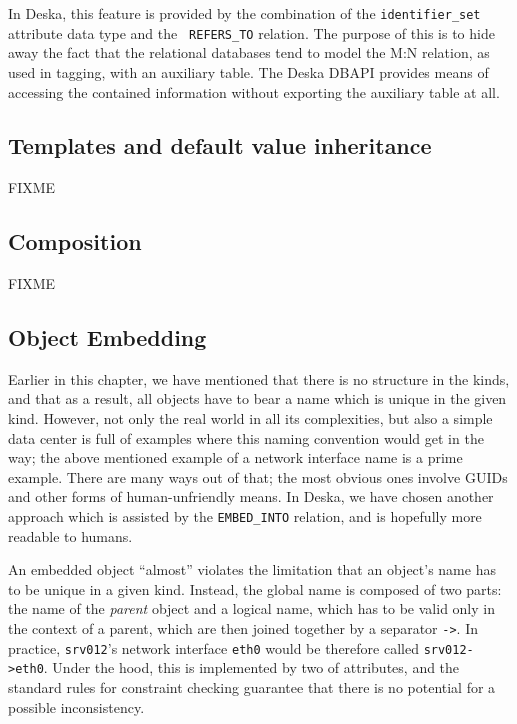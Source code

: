 \documentclass{article}
\begin{document}
In Deska, this feature is provided by the combination of the {\tt identifier\_set} attribute data type and the {\tt
REFERS\_TO} relation.  The purpose of this is to hide away the fact that the relational databases tend to model the M:N
relation, as used in tagging, with an auxiliary table.  The Deska DBAPI provides means of accessing the contained
information without exporting the auxiliary table at all.

\subsection{Templates and default value inheritance}

FIXME

\subsection{Composition}

FIXME

\subsection{Object Embedding}

Earlier in this chapter, we have mentioned that there is no structure in the kinds, and that as a result, all objects
have to bear a name which is unique in the given kind.  However, not only the real world in all its complexities, but
also a simple data center is full of examples where this naming convention would get in the way; the above mentioned
example of a network interface name is a prime example.  There are many ways out of that; the most obvious ones involve
GUIDs and other forms of human-unfriendly means.  In Deska, we have chosen another approach which is assisted by the
{\tt EMBED\_INTO} relation, and is hopefully more readable to humans.

An embedded object ``almost'' violates the limitation that an object's name has to be unique in a given kind.  Instead,
the global name is composed of two parts: the name of the {\em parent} object and a logical name, which has to be valid
only in the context of a parent, which are then joined together by a separator {\tt ->}.  In practice, {\tt srv012}'s
network interface {\tt eth0} would be therefore called {\tt srv012->eth0}.  Under the hood, this is implemented by
two of attributes, and the standard rules for constraint checking guarantee that there is no potential for a possible
inconsistency.
\end{document}
